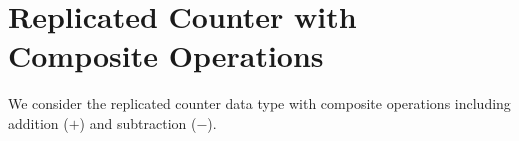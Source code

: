 
\section{Replicated Counter with Composite Operations}

We consider the replicated counter data type with composite operations 
including addition ($+$) and subtraction ($-$).


